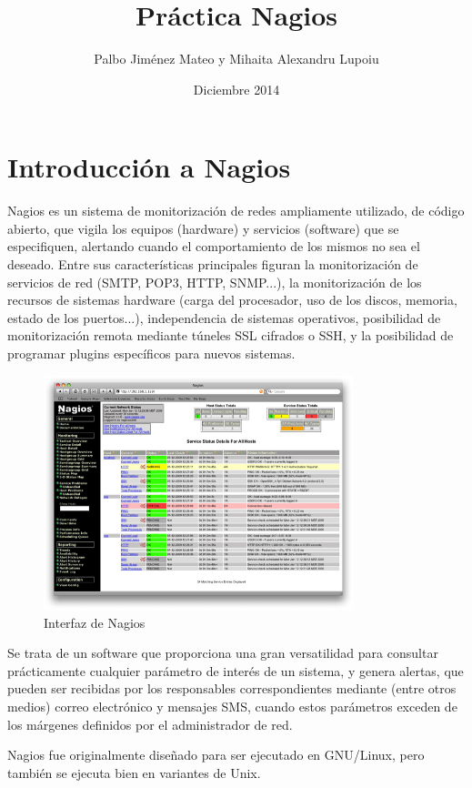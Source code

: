 \documentclass[11pt,a4paper]{article}
\title{Práctica Nagios}
\author{Palbo Jiménez Mateo y Mihaita Alexandru Lupoiu}
\date{Diciembre 2014}
\begin{document}
\maketitle
\tableofcontents
\clearpage

\section{Introducción a Nagios}

    Nagios es un sistema de monitorización de redes ampliamente utilizado, de código abierto, que vigila los equipos (hardware) y servicios (software) que se especifiquen, alertando cuando el comportamiento de los mismos no sea el deseado. Entre sus características principales figuran la monitorización de servicios de red (SMTP, POP3, HTTP, SNMP...), la monitorización de los recursos de sistemas hardware (carga del procesador, uso de los discos, memoria, estado de los puertos...), independencia de sistemas operativos, posibilidad de monitorización remota mediante túneles SSL cifrados o SSH, y la posibilidad de programar plugins específicos para nuevos sistemas\cite{nagios-wikipedia}.
    
\begin{figure}[hbtp]
\centerline{\includegraphics[width=9cm]{nagios3-1.png}}
\caption{Interfaz de Nagios}
\label{figura1}
\end{figure}    

    Se trata de un software que proporciona una gran versatilidad para consultar prácticamente cualquier parámetro de interés de un sistema, y genera alertas, que pueden ser recibidas por los responsables correspondientes mediante (entre otros medios) correo electrónico y mensajes SMS, cuando estos parámetros exceden de los márgenes definidos por el administrador de red.

    Nagios\cite{web} fue originalmente diseñado para ser ejecutado en GNU/Linux, pero también se ejecuta bien en variantes de Unix.
\end{document}
